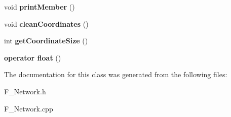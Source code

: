 \begin{DoxyCompactItemize}
\item 
void {\bfseries print\+Member} ()\hypertarget{classF__Network_a9012035a4f34c91a5c8772ee5199a1ae}{}\label{classF__Network_a9012035a4f34c91a5c8772ee5199a1ae}

\item 
void {\bfseries clean\+Coordinates} ()\hypertarget{classF__Network_a8fe5171929eeb796eb8cf3bfcb6ebb0c}{}\label{classF__Network_a8fe5171929eeb796eb8cf3bfcb6ebb0c}

\item 
int {\bfseries get\+Coordinate\+Size} ()\hypertarget{classF__Network_ab257d2e1e3fe96ef5e74811c0b5d5617}{}\label{classF__Network_ab257d2e1e3fe96ef5e74811c0b5d5617}

\item 
{\bfseries operator float} ()\hypertarget{classF__Network_a1f338c79d94838a11a3e4675792cb011}{}\label{classF__Network_a1f338c79d94838a11a3e4675792cb011}

\end{DoxyCompactItemize}


The documentation for this class was generated from the following files\+:\begin{DoxyCompactItemize}
\item 
F\+\_\+\+Network.\+h\item 
F\+\_\+\+Network.\+cpp\end{DoxyCompactItemize}
